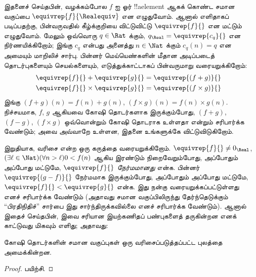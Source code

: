 \documentclass[../../../include/open-logic-section]{subfiles}
\begin{document}
இதனைச் செய்தபின், வழக்கம்போல $f$ ஐ ஓர் !!a{element} ஆகக் கொண்ட
சமான வகுப்பை $\equivrep{f}{\Realequiv}$ என எழுதுவோம்.
ஆனால் எளிதாகப் படிப்பதற்கு, பின்வருவதில் கீழ்க்குறியை விட்டுவிட்டு
$\equivrep{f}{}$ என மட்டும் எழுதுவோம்.
மேலும் ஒவ்வொரு $q \in \Rat$ க்கும்,
$q_{\Real} = \equivrep{c_{q}}{}$ என நிர்ணயிக்கிறோம்;
இங்கு $c_{q}$ என்பது அனைத்து $n \in \Nat$ க்கும்
$c_q(n) = q$ என அமையும் மாறிலிச் சார்பு.
பின்னர் மெய்யெண்களின் மீதான அடிப்படைத் தொடர்புகளையும் செயல்களையும்,
எடுத்துக்காட்டாகப் பின்வருமாறு வரையறுக்கிறோம்:
\begin{align*}
	\equivrep{f}{} + \equivrep{g}{} &= 	\equivrep{(f + g)}{} \\
	\equivrep{f}{} \times 	\equivrep{g}{} &= \equivrep{(f \times g)}{}
\end{align*}
இங்கு $(f + g)(n) = f(n) + g(n)$, $(f \times g)(n) = f(n) \times
g(n)$.
நிச்சயமாக, $f$, $g$ ஆகியவை கோஷி தொடர்களாக இருக்கும்போது,
$(f + g)$, $(f-g)$, $(f\times g)$ ஒவ்வொன்றும் கோஷி தொடராக உள்ளதா
என்றும் சரிபார்க்க வேண்டும்; அவை அவ்வாறே உள்ளன,
இதனை உங்களுக்கே விட்டுவிடுகிறோம்.

இறுதியாக, வரிசை என்ற ஒரு கருத்தை வரையறுக்கிறோம்.
$\equivrep{f}{}\neq 0_\Real$, $(\exists
\ell \in \Nat)(\forall n > \ell)0 < f(n)$ ஆகிய இரண்டும்
நிறைவேறும்போது, அப்போதும் அப்போது மட்டுமே,
$\equivrep{f}{}$ \emph{நேர்மமானது} என்க.
பின்னர் $\equivrep{(g - f)}{}$ நேர்மமாக இருக்கும்போது,
அப்போதும் அப்போது மட்டுமே,
$\equivrep{f}{} < \equivrep{g}{}$ என்க.
இது நன்கு வரையறுக்கப்பட்டுள்ளது எனச் சரிபார்க்க வேண்டும்
(அதாவது சமான வகுப்பிலிருந்து தேர்ந்தெடுக்கும் ``பிரதிநிதிச்'' சார்பை
இது சார்ந்திருக்கவில்லை எனச் சரிபார்க்க வேண்டும்).
ஆனால் இதைச் செய்தபின், இவை சரியான இயற்கணிதப் பண்புகளைத் தருகின்றன
எனக் காட்டுவது மிகவும் எளிது; அதாவது:

\begin{thm}
கோஷி தொடர்களின் சமான வகுப்புகள் ஒரு வரிசைப்படுத்தப்பட்ட புலத்தை அமைக்கின்றன.
\end{thm}

\begin{proof}
பயிற்சி.
\end{proof}
\end{document}
